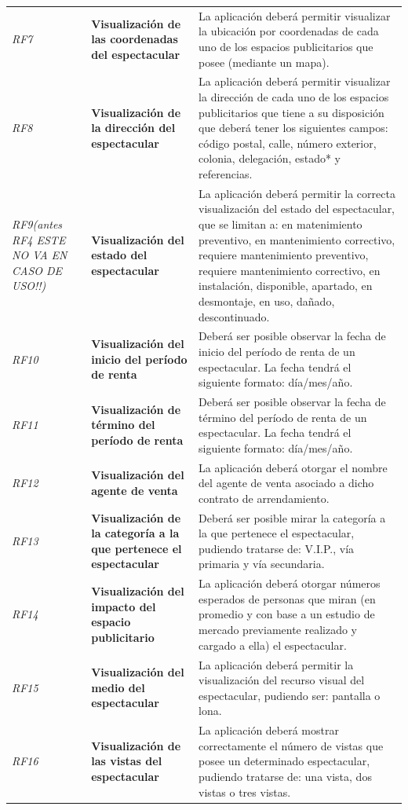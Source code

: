 \documentclass[12pt]{article}
\begin{document}
{\begin{longtable}[H]{m{2cm}m{4cm}m{6cm}}
    \textit{RF7} & \textbf{Visualización de las coordenadas del espectacular} & La aplicación deberá permitir visualizar la ubicación por coordenadas de cada uno de los espacios publicitarios que posee (mediante un mapa). \tabularnewline
    \textit{RF8} & \textbf{Visualización de la dirección del espectacular} & La aplicación deberá permitir visualizar la dirección de cada uno de los espacios publicitarios que tiene a su disposición que deberá tener los siguientes campos: código postal, calle, número exterior, colonia, delegación, estado* y referencias. \tabularnewline
    \textit{RF9(antes RF4 ESTE NO VA EN CASO DE USO!!)} & \textbf{Visualización  del estado del espectacular} & La aplicación deberá permitir la correcta visualización del estado del espectacular, que se limitan a: en matenimiento preventivo, en mantenimiento correctivo, requiere mantenimiento preventivo, requiere mantenimiento correctivo, en instalación, disponible, apartado, en desmontaje, en uso, dañado, descontinuado. \tabularnewline
    \textit{RF10} & \textbf{Visualización del inicio del período de renta} & Deberá ser posible observar la fecha de inicio del período de renta de un espectacular. La fecha tendrá el siguiente formato: día/mes/año. \tabularnewline
    \textit{RF11} & \textbf{Visualización de término del período de renta} & Deberá ser posible observar la fecha de término del período de renta de un espectacular. La fecha tendrá el siguiente formato: día/mes/año.
    \tabularnewline
    \textit{RF12} & \textbf{Visualización del agente de venta} & La aplicación deberá otorgar el nombre del agente de venta asociado a dicho contrato de arrendamiento. \tabularnewline
    \textit{RF13} & \textbf{Visualización de la categoría a la que pertenece el espectacular} & Deberá ser posible mirar la categoría a la que pertenece el espectacular, pudiendo tratarse de: V.I.P., vía primaria y vía secundaria. \tabularnewline
    \textit{RF14} & \textbf{Visualización del impacto del espacio publicitario} & La aplicación deberá otorgar números esperados de personas que miran (en promedio y con base a un estudio de mercado previamente realizado y cargado a ella) el espectacular. \tabularnewline
    \textit{RF15} & \textbf{Visualización del medio del espectacular} & La aplicación deberá permitir la visualización del recurso visual del espectacular, pudiendo ser: pantalla o lona. \tabularnewline
    \textit{RF16} & \textbf{Visualización de las vistas del espectacular} & La aplicación deberá mostrar correctamente el número de vistas que posee un determinado espectacular, pudiendo tratarse de: una vista, dos vistas o tres vistas. \tabularnewline

\end{longtable}}
\end{document}
